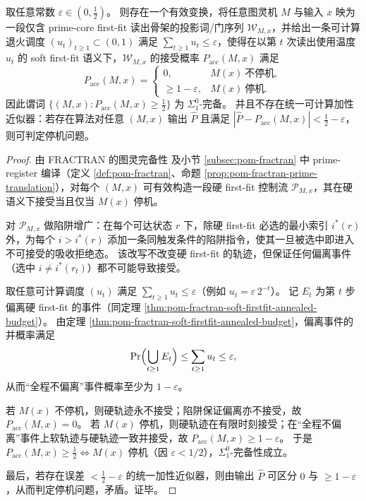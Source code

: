 \begin{theorem}\label{thm:conclusion-annealed-soft-firstfit-gap-halting}
取任意常数 \(\varepsilon\in(0,\frac12)\)。
则存在一个有效变换，将任意图灵机 \(M\) 与输入 \(x\) 映为一段仅含 prime-core first-fit 读出骨架的投影词/门序列 \(\mathcal W_{M,x}\)，并给出一条可计算退火调度 \((u_t)_{t\ge 1}\subset(0,1)\) 满足 \(\sum_{t\ge 1}u_t\le\varepsilon\)，使得在以第 \(t\) 次读出使用温度 \(u_t\) 的 soft first-fit 语义下，\(\mathcal W_{M,x}\) 的接受概率 \(P_{\mathrm{acc}}(M,x)\) 满足
\[
P_{\mathrm{acc}}(M,x)=
\begin{cases}
0,&M(x)\ \text{不停机},\\[2pt]
\ge 1-\varepsilon,&M(x)\ \text{停机}.
\end{cases}
\]
因此谓词 \(\{(M,x):P_{\mathrm{acc}}(M,x)\ge \tfrac12\}\) 为 \(\Sigma^0_1\)-完备。
并且不存在统一可计算加性近似器：若存在算法对任意 \((M,x)\) 输出 \(\widehat P\) 且满足 \(|\widehat P-P_{\mathrm{acc}}(M,x)|<\tfrac12-\varepsilon\)，则可判定停机问题。
\end{theorem}
\begin{proof}
由 FRACTRAN 的图灵完备性 \cite{Conway1987FRACTRAN} 及小节 \ref{subsec:pom-fractran} 中 prime-register 编译（定义 \ref{def:pom-fractran}、命题 \ref{prop:pom-fractran-prime-translation}），对每个 \((M,x)\) 可有效构造一段硬 first-fit 控制流 \(\mathcal P_{M,x}\)，其在硬语义下接受当且仅当 \(M(x)\) 停机。

对 \(\mathcal P_{M,x}\) 做陷阱增广：在每个可达状态 \(r\) 下，除硬 first-fit 必选的最小索引 \(i^\ast(r)\) 外，为每个 \(i>i^\ast(r)\) 添加一条同触发条件的陷阱指令，使其一旦被选中即进入不可接受的吸收拒绝态。
该改写不改变硬 first-fit 的轨迹，但保证任何偏离事件（选中 \(i\neq i^\ast(r_t)\)）都不可能导致接受。

取任意可计算调度 \((u_t)\) 满足 \(\sum_{t\ge 1}u_t\le\varepsilon\)（例如 \(u_t=\varepsilon\,2^{-t}\)）。
记 \(E_t\) 为第 \(t\) 步偏离硬 first-fit 的事件（同定理 \ref{thm:pom-fractran-soft-firstfit-annealed-budget}）。
由定理 \ref{thm:pom-fractran-soft-firstfit-annealed-budget}，偏离事件的并概率满足
\[
\Pr\Bigl(\bigcup_{t\ge 1}E_t\Bigr)\le \sum_{t\ge 1}u_t\le \varepsilon,
\]
从而“全程不偏离”事件概率至少为 \(1-\varepsilon\)。

若 \(M(x)\) 不停机，则硬轨迹永不接受；陷阱保证偏离亦不接受，故 \(P_{\mathrm{acc}}(M,x)=0\)。
若 \(M(x)\) 停机，则硬轨迹在有限时刻接受；在“全程不偏离”事件上软轨迹与硬轨迹一致并接受，故 \(P_{\mathrm{acc}}(M,x)\ge 1-\varepsilon\)。
于是 \(P_{\mathrm{acc}}(M,x)\ge \tfrac12\iff M(x)\) 停机（因 \(\varepsilon<1/2\)），\(\Sigma^0_1\)-完备性成立。

最后，若存在误差 \(<\tfrac12-\varepsilon\) 的统一加性近似器，则由输出 \(\widehat P\) 可区分 \(0\) 与 \(\ge 1-\varepsilon\)，从而判定停机问题，矛盾。证毕。
\end{proof}

